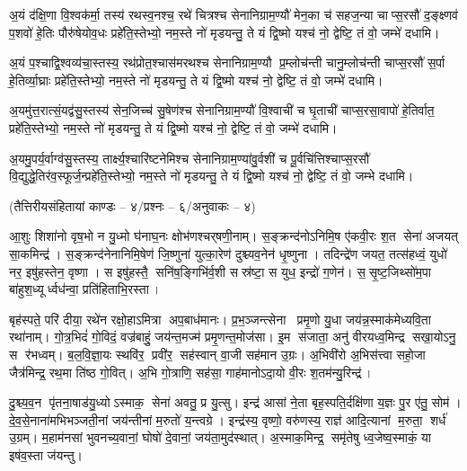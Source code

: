 अ॒यं द॑क्षि॒णा वि॒श्वक॑र्मा॒ तस्य॑ रथस्व॒नश्च॒ रथे॑ चित्रश्च  सेनानिग्राम॒ण्यौ॑
मेन॒का च॑ सहज॒न्या चाप्स॒रसौ॑
द॒ङ्क्ष्णव॑ प॒शवो॑ हे॒तिः पौरु॑षेयोव॒धः प्रहे॑ति॒स्तेभ्यो॒
नम॒स्ते नो॑ मृडयन्तु॒ ते यं द्वि॒ष्मो यश्च॑ नो॒ द्वेष्टि॒ तं वो॒  जम्भे॑ दधामि।

अ॒यं प॒श्चाद्वि॒श्वव्य॑चा॒स्तस्य॒ रथ॑प्रोत॒श्चास॑मरथश्च सेनानिग्राम॒ण्यौ
प्र॒म्लोच॑न्ती चानु॒म्लोच॑न्ती चाप्स॒रसौ॑ स॒र्पा हे॒तिर्व्या॒घ्राः प्रहे॑ति॒स्तेभ्यो॒
नम॒स्ते नो॑ मृडयन्तु॒ ते यं द्वि॒ष्मो यश्च॑ नो॒ द्वेष्टि॒ तं वो॒  जम्भे॑ दधामि।

अ॒यमु॑त्त॒रात्सं॒यद्व॑सु॒स्तस्य॑ सेन॒जिच्च॑ सु॒षेण॑श्च सेनानिग्राम॒ण्यौ॑
वि॒श्वाची॑ च घृ॒ताची॑ चाप्स॒रसा॒वापो॑ हे॒तिर्वात॒ प्रहे॑ति॒स्तेभ्यो॒
नम॒स्ते नो॑ मृडयन्तु॒ ते यं द्वि॒ष्मो यश्च॑ नो॒ द्वेष्टि॒ तं वो॒  जम्भे॑ दधामि।

अ॒यमु॒पर्य॒र्वाग्व॑सु॒स्तस्य॒ तार्क्ष्य॒श्चारि॑ष्टनेमिश्च  सेनानि\-ग्राम॒ण्या॑वु॒र्वशी॑ च
पू॒र्वचि॑त्तिश्चाप्स॒रसौ॑ वि॒द्युद्धे॒तिर॑व॒\-स्फूर्ज॒न्प्रहे॑ति॒स्तेभ्यो॒
नम॒स्ते नो॑ मृडयन्तु॒ ते यं द्वि॒ष्मो यश्च॑ नो॒ द्वेष्टि॒ तं वो॒  जम्भे दधामि।


\centerline{\normalsize (तैत्तिरीयसंहितायां काण्डः – ४/प्रश्नः – ६/अनुवाकः – ४)}

आ॒शुः शिशा॑नो वृष॒भो न यु॒ध्मो घ॑नाघ॒नः क्षोभ॑णश्चर्‌षणी॒नाम्। स॒ङ्क्रन्द॑नोऽनिमि॒ष ए॑कवी॒रः श॒त सेना॑ अजयत् सा॒कमिन्द्र॑। स॒ङ्क्रन्द॑नेनानिमि॒षेण॑ जि॒ष्णुना॑ युत्का॒रेण॑ दुश्च्यव॒नेन॑ धृ॒ष्णुना। तदिन्द्रे॑ण जयत॒ तत्स॑हध्वं॒ युधो॑ नर॒ इषु॑हस्तेन॒ वृष्णा। स इषु॑हस्तै॒ सनि॑ष॒ङ्गिभि॑र्व॒शी सस्र॑ष्टा॒ स युध॒ इन्द्रो॑ ग॒णेन॑। स॒सृ॒ष्ट॒जिथ्सो॑म॒पा बा॑हुश॒ध्यूर्ध्वध॑न्वा॒ प्रति॑हिताभि॒रस्ता।

बृह॑स्पते॒ परि॑ दीया॒ रथे॑न रक्षो॒हाऽमित्रा अप॒बाध॑मानः। प्र॒भ॒ञ्जन्त्सेना प्रमृ॒णो यु॒धा जय॑न्न॒स्माक॑मेध्यवि॒ता रथा॑नाम्। गो॒त्र॒भिदं॑ गो॒विदं॒ वज्र॑बाहुं॒ जय॑न्त॒मज्म॑ प्रमृ॒णन्त॒मोज॑सा। इ॒म स॑जाता॒ अनु॑ वीरयध्व॒मिन्द्र सखा॒योऽनु॒ स र॑भध्वम्। ब॒ल॒वि॒ज्ञा॒यः स्थवि॑र॒ प्रवी॑र॒ सह॑स्वान् वा॒जी सह॑मान उ॒ग्रः। अ॒भिवी॑रो अ॒भिस॑त्त्वा सहो॒जा जैत्र॑मिन्द्र॒ रथ॒मा ति॑ष्ठ गो॒वित्। अ॒भि गो॒त्राणि॒ सह॑सा॒ गाह॑मानोऽदा॒यो वी॒रः श॒तम॑न्यु॒रिन्द्र॑।

दु॒श्च्य॒व॒न पृ॑तना॒षाड॑यु॒ध्योऽस्माक॒ सेना॑ अवतु॒ प्र यु॒त्सु। इन्द्र॑ आसां ने॒ता बृह॒स्पति॒र्दक्षि॑णा य॒ज्ञः पु॒र ए॑तु॒ सोम॑। दे॒व॒से॒नाना॑मभिभञ्जती॒नां जय॑न्तीनां म॒रुतो॑ य॒न्त्वग्रे। इन्द्र॑स्य॒ वृष्णो॒ वरु॑णस्य॒ राज्ञ॑ आदि॒त्यानां म॒रुता॒ शर्ध॑ उ॒ग्रम्। म॒हाम॑नसां भुवनच्य॒वानां॒ घोषो॑ दे॒वानां॒ जय॑ता॒मुद॑स्थात्। अ॒स्माक॒मिन्द्र॒ समृ॑तेषु ध्व॒जेष्व॒स्माकं॒ या इष॑व॒स्ता ज॑यन्तु।


